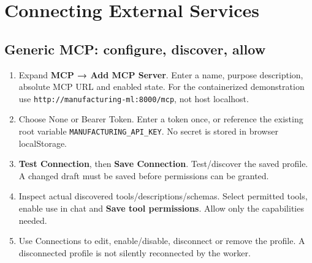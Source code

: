 \chapter{Connecting External Services}
\section{Generic MCP: configure, discover, allow}
\begin{enumerate}
\item Expand \textbf{MCP → Add MCP Server}. Enter a name, purpose description, absolute MCP URL and enabled state. For the containerized demonstration use \texttt{http://manufacturing-ml:8000/mcp}, not host localhost.
\item Choose None or Bearer Token. Enter a token once, or reference the existing root variable \texttt{MANUFACTURING\_API\_KEY}. No secret is stored in browser localStorage.
\item \textbf{Test Connection}, then \textbf{Save Connection}. Test/discover the saved profile. A changed draft must be saved before permissions can be granted.
\item Inspect actual discovered tools/descriptions/schemas. Select permitted tools, enable use in chat and \textbf{Save tool permissions}. Allow only the capabilities needed.
\item Use Connections to edit, enable/disable, disconnect or remove the profile. A disconnected profile is not silently reconnected by the worker.
\end{enumerate}
